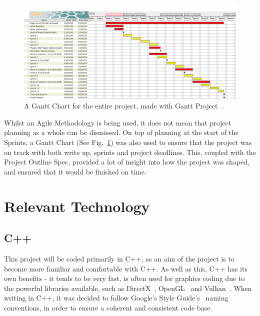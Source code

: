 \documentclass[a4paper,10pt]{report}
\begin{document}
\begin{figure}[h!]
    \centering
  \includegraphics[width=1\textwidth]{Images/Charts/GanttChart.png}
 \caption{A Gantt Chart for the entire project, made with Gantt Project~\cite{gantt}.}
 \label{fig:gantt_chart}
\end{figure}


Whilst an Agile Methodology is being used, it does not mean that project planning as a whole can be dismissed. On top of planning at the start of the Sprints, a Gantt Chart (See Fig.~\ref{fig:gantt_chart}) was also used to ensure that the project was on track with both write up, sprints and project deadlines. This, coupled with the Project Outline Spec, provided a lot of insight into how the project was shaped, and ensured that it would be finished on time. \medskip


\section{Relevant Technology}

\subsection{C++}

This project will be coded primarily in C++, as an aim of the project is to become more familiar and comfortable with C++. As well as this, C++ has its own benefits - it tends to be very fast, is often used for graphics coding due to the powerful libraries available, such as DirectX~\cite{directx_website}, OpenGL~\cite{OpenGL_website} and Vulkan~\cite{vulkan_website}. When writing in C++, it was decided to follow Google's Style Guide's~\cite{google_c_style_guide} naming conventions, in order to ensure a coherent and consistent code base.
\end{document}
